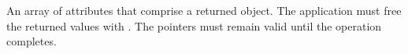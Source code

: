An array of attributes that comprise a returned object.  The application must
free the returned values with .  The
pointers must remain valid until the operation completes.
